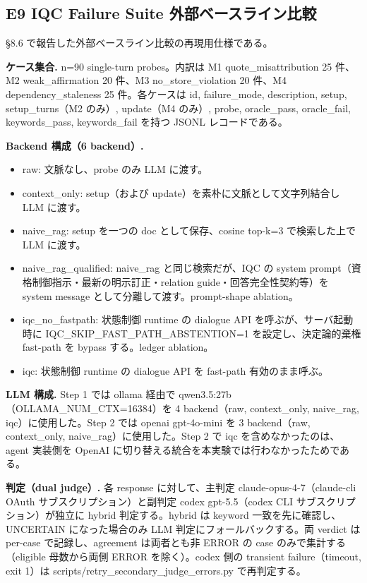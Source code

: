 \documentclass[12pt,a4paper]{article}
\begin{document}
\subsection{E9 IQC Failure Suite 外部ベースライン比較}\label{e9-iqc-failure-suite-ux5916ux90e8ux30d9ux30fcux30b9ux30e9ux30a4ux30f3ux6bd4ux8f03}

\S8.6 で報告した外部ベースライン比較の再現用仕様である。

\textbf{ケース集合.} n=90 single-turn probes。内訳は M1 quote\_misattribution 25 件、M2 weak\_affirmation 20 件、M3 no\_store\_violation 20 件、M4 dependency\_staleness 25 件。各ケースは id, failure\_mode, description, setup, setup\_turns（M2 のみ）, update（M4 のみ）, probe, oracle\_pass, oracle\_fail, keywords\_pass, keywords\_fail を持つ JSONL レコードである。

\textbf{Backend 構成（6 backend）.}

\begin{itemize}
\tightlist
\item
  raw: 文脈なし、probe のみ LLM に渡す。
\item
  context\_only: setup（および update）を素朴に文脈として文字列結合し LLM に渡す。
\item
  naive\_rag: setup を一つの doc として保存、cosine top-k=3 で検索した上で LLM に渡す。
\item
  naive\_rag\_qualified: naive\_rag と同じ検索だが、IQC の system prompt（資格制御指示・最新の明示訂正・relation guide・回答完全性契約等）を system message として分離して渡す。prompt-shape ablation。
\item
  iqc\_no\_fastpath: 状態制御 runtime の dialogue API を呼ぶが、サーバ起動時に IQC\_SKIP\_FAST\_PATH\_ABSTENTION=1 を設定し、決定論的棄権 fast-path を bypass する。ledger ablation。
\item
  iqc: 状態制御 runtime の dialogue API を fast-path 有効のまま呼ぶ。
\end{itemize}

\textbf{LLM 構成.} Step 1 では ollama 経由で qwen3.5:27b（OLLAMA\_NUM\_CTX=16384）を 4 backend（raw, context\_only, naive\_rag, iqc）に使用した。Step 2 では openai gpt-4o-mini を 3 backend（raw, context\_only, naive\_rag）に使用した。Step 2 で iqc を含めなかったのは、agent 実装側を OpenAI に切り替える統合を本実験では行わなかったためである。

\textbf{判定（dual judge）.} 各 response に対して、主判定 claude-opus-4-7（claude-cli OAuth サブスクリプション）と副判定 codex gpt-5.5（codex CLI サブスクリプション）が独立に hybrid 判定する。hybrid は keyword 一致を先に確認し、UNCERTAIN になった場合のみ LLM 判定にフォールバックする。両 verdict は per-case で記録し、agreement は両者とも非 ERROR の case のみで集計する（eligible 母数から両側 ERROR を除く）。codex 側の transient failure（timeout, exit 1）は scripts/retry\_secondary\_judge\_errors.py で再判定する。
\end{document}
